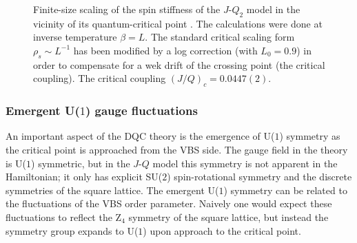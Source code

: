 \documentclass[range]{ar2e}
\begin{document}
\begin{figure}
\centerline{}
\caption{Finite-size scaling of the spin stiffness of the $J$-$Q_2$ model in the vicinity of its quantum-critical point \cite{Sandvik10c}. The 
calculations were done at inverse temperature $\beta=L$. The standard critical scaling form $\rho_s \sim L^{-1}$ has been modified by a log correction 
(with $L_0=0.9$) in order to compensate for a wek drift of the crossing point (the critical coupling). The critical coupling $(J/Q)_c = 0.0447(2)$.}
\label{jqrhos}
\end{figure}

\subsubsection{Emergent U($1$) gauge fluctuations}

An important aspect of the DQC theory is the emergence of U($1$) symmetry as the critical point is approached from the VBS side. 
The gauge field in the theory is U($1$) symmetric, but in the $J$-$Q$ model this symmetry is not apparent in the Hamiltonian; it
only has explicit SU($2$) spin-rotational symmetry and the discrete symmetries of the square lattice. The emergent U($1$) symmetry 
can be related to the fluctuations of the VBS order parameter. Naively one would expect these fluctuations to reflect the Z$_4$
symmetry of the square lattice, but instead the symmetry group expands to U($1$) upon approach to the critical point.
\end{document}
